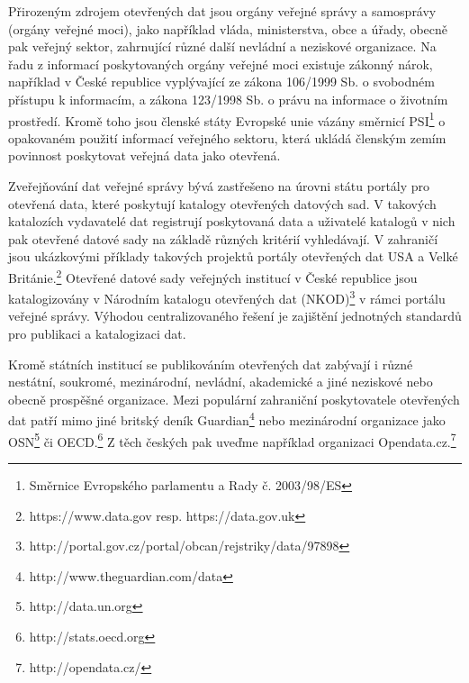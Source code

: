Přirozeným zdrojem otevřených dat jsou orgány veřejné správy a samosprávy (orgány veřejné moci), jako například vláda, ministerstva, obce a úřady, obecně pak veřejný sektor, zahrnující různé další nevládní a neziskové organizace. Na řadu z informací poskytovaných orgány veřejné moci existuje zákonný nárok, například v České republice vyplývající ze zákona 106/1999 Sb. o svobodném přístupu k informacím, a zákona 123/1998 Sb. o právu na informace o životním prostředí. Kromě toho jsou členské státy Evropské unie vázány směrnicí PSI\footnote{Směrnice Evropského parlamentu a Rady č. 2003/98/ES} o opakovaném použití informací veřejného sektoru, která ukládá členským zemím povinnost poskytovat veřejná data jako otevřená.

Zveřejňování dat veřejné správy bývá zastřešeno na úrovni státu portály pro otevřená data, které poskytují katalogy otevřených datových sad. V takových katalozích vydavatelé dat registrují poskytovaná data a uživatelé katalogů v nich pak otevřené datové sady na základě různých kritérií vyhledávají. V zahraničí jsou ukázkovými příklady takových projektů portály otevřených dat USA a Velké Británie.\footnote{https://www.data.gov resp. https://data.gov.uk} Otevřené datové sady veřejných institucí v České republice jsou katalogizovány v Národním katalogu otevřených dat (NKOD)\footnote{http://portal.gov.cz/portal/obcan/rejstriky/data/97898} v rámci portálu veřejné správy. Výhodou centralizovaného řešení je zajištění jednotných standardů pro publikaci a katalogizaci dat.

Kromě státních institucí se publikováním otevřených dat zabývají i různé nestátní, soukromé, mezinárodní, nevládní, akademické a jiné neziskové nebo obecně prospěšné organizace. Mezi populární zahraniční poskytovatele otevřených dat patří mimo jiné britský deník Guardian\footnote{http://www.theguardian.com/data} nebo mezinárodní organizace jako OSN\footnote{http://data.un.org} či OECD.\footnote{http://stats.oecd.org} Z těch českých pak uveďme například organizaci Opendata.cz.\footnote{http://opendata.cz/}


